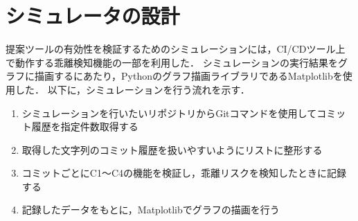 \section{シミュレータの設計}
提案ツールの有効性を検証するためのシミュレーションには，CI/CDツール上で動作する乖離検知機能の一部を利用した．
シミュレーションの実行結果をグラフに描画するにあたり，Pythonのグラフ描画ライブラリであるMatplotlibを使用した．
以下に，シミュレーションを行う流れを示す．
\begin{enumerate}
    \item シミュレーションを行いたいリポジトリからGitコマンドを使用してコミット履歴を指定件数取得する
    \item 取得した文字列のコミット履歴を扱いやすいようにリストに整形する
    \item コミットごとにC1〜C4の機能を検証し，乖離リスクを検知したときに記録する
    \item 記録したデータをもとに，Matplotlibでグラフの描画を行う
\end{enumerate}